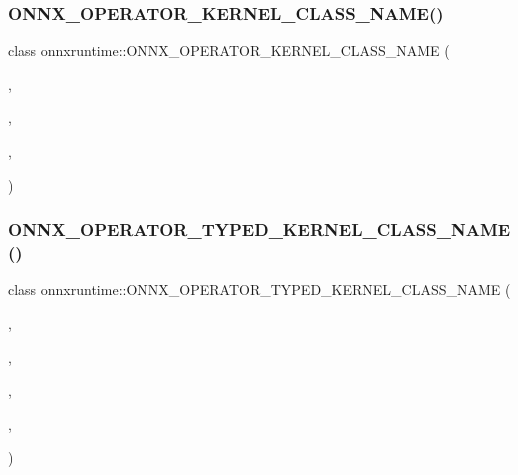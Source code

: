 \subsubsection{\texorpdfstring{O\+N\+N\+X\+\_\+\+O\+P\+E\+R\+A\+T\+O\+R\+\_\+\+K\+E\+R\+N\+E\+L\+\_\+\+C\+L\+A\+S\+S\+\_\+\+N\+A\+M\+E()}{ONNX\_OPERATOR\_KERNEL\_CLASS\_NAME()}\hspace{0.1cm}{\footnotesize\ttfamily [84/84]}}
{\footnotesize\ttfamily class onnxruntime\+::\+O\+N\+N\+X\+\_\+\+O\+P\+E\+R\+A\+T\+O\+R\+\_\+\+K\+E\+R\+N\+E\+L\+\_\+\+C\+L\+A\+S\+S\+\_\+\+N\+A\+ME (\begin{DoxyParamCaption}\item[{\mbox{\hyperlink{namespaceonnxruntime_a394a3c7e50622de1f203a96df592060d}{k\+Cpu\+Execution\+Provider}}}]{,  }\item[{\mbox{\hyperlink{namespaceonnxruntime_ac0e7c0c106a2c9e9594560a3ab289fa0}{k\+Onnx\+Domain}}}]{,  }\item[{7}]{,  }\item[{\mbox{\hyperlink{classonnxruntime_1_1RNN}{R\+NN}}}]{ }\end{DoxyParamCaption})}

\mbox{\label{namespaceonnxruntime_a40a6fc772f0c61fc5a5bb104e01733fc}} 
\subsubsection{\texorpdfstring{O\+N\+N\+X\+\_\+\+O\+P\+E\+R\+A\+T\+O\+R\+\_\+\+T\+Y\+P\+E\+D\+\_\+\+K\+E\+R\+N\+E\+L\+\_\+\+C\+L\+A\+S\+S\+\_\+\+N\+A\+M\+E()}{ONNX\_OPERATOR\_TYPED\_KERNEL\_CLASS\_NAME()}\hspace{0.1cm}{\footnotesize\ttfamily [1/70]}}
{\footnotesize\ttfamily class onnxruntime\+::\+O\+N\+N\+X\+\_\+\+O\+P\+E\+R\+A\+T\+O\+R\+\_\+\+T\+Y\+P\+E\+D\+\_\+\+K\+E\+R\+N\+E\+L\+\_\+\+C\+L\+A\+S\+S\+\_\+\+N\+A\+ME (\begin{DoxyParamCaption}\item[{\mbox{\hyperlink{namespaceonnxruntime_a394a3c7e50622de1f203a96df592060d}{k\+Cpu\+Execution\+Provider}}}]{,  }\item[{\mbox{\hyperlink{namespaceonnxruntime_ac0e7c0c106a2c9e9594560a3ab289fa0}{k\+Onnx\+Domain}}}]{,  }\item[{1}]{,  }\item[{int32\+\_\+t}]{,  }\item[{\mbox{\hyperlink{classonnxruntime_1_1ArgMin}{Arg\+Min}}}]{ }\end{DoxyParamCaption})}

